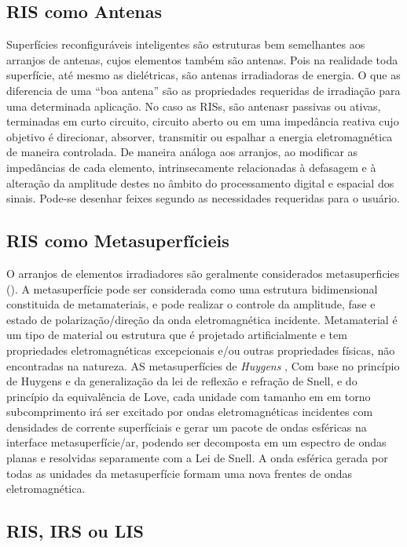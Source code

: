 \documentclass[
	12pt,				%
	openright,			%
	oneside,			%
	a4paper,			%
	english,			%
	brazil				%
	]{abntex2}
\begin{document}
\subsection{RIS como Antenas }  

Superfícies reconfiguráveis inteligentes são estruturas bem semelhantes aos arranjos de antenas, cujos elementos também são antenas. Pois na realidade toda superfície, até mesmo as dielétricas, são antenas irradiadoras de energia. O que as diferencia de uma “boa antena” são as propriedades requeridas de irradiação para uma determinada aplicação. No caso as RISs, são antenasr passivas ou ativas, terminadas em curto circuito, circuito aberto ou em uma impedância reativa cujo objetivo é direcionar, absorver, transmitir ou espalhar a energia eletromagnética de maneira controlada. De maneira análoga aos arranjos, ao modificar as impedâncias de cada elemento, intrinsecamente relacionadas à defasagem e à alteração da amplitude destes no âmbito do processamento digital e espacial dos sinais. Pode-se desenhar feixes segundo as necessidades requeridas para o usuário.

\subsection{RIS como Metasuperfícieis} 

O arranjos de elementos irradiadores são geralmente considerados metasuperficies (). A metasuperfície pode ser considerada como uma estrutura bidimensional constituida de metamateriais, e pode realizar o controle da amplitude, fase e estado de polarização/direção da onda eletromagnética incidente. Metamaterial é um tipo de material ou estrutura que é projetado artificialmente e tem propriedades eletromagnéticas excepcionais e/ou outras propriedades físicas, não encontradas na natureza. AS metasuperfícies de \textit{Huygens} , 
Com base no princípio de Huygens e da generalização da lei de reflexão e refração de Snell, e do princípio da equivalência de Love, cada unidade com tamanho em em torno subcomprimento irá ser excitado por ondas eletromagnéticas incidentes com densidades de corrente superfíciais e gerar um pacote de ondas esféricas na interface metasuperfície/ar, podendo ser decomposta em um espectro de ondas planas e resolvidas separamente com a Lei de Snell. A onda esférica gerada por todas as unidades da metasuperfície formam uma nova frentes de ondas eletromagnética. 

\subsection{RIS, IRS ou LIS} 
    
\end{document}

